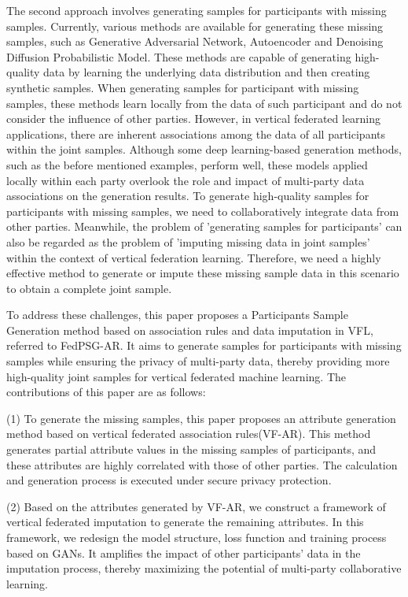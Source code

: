 \documentclass[final,1p,times]{elsarticle}
\begin{document}
The second approach involves generating samples for participants with missing samples. Currently, various methods are available for generating these missing samples, such as Generative Adversarial Network\cite{7}, Autoencoder\cite{8} and Denoising Diffusion Probabilistic Model\cite{9}. These methods are capable of generating high-quality data by learning the underlying data distribution and then creating synthetic samples. When generating samples for participant with missing samples, these methods learn locally from the data of such participant and do not consider the influence of other parties. However, in vertical federated learning applications, there are inherent associations among the data of all participants within the joint samples. Although some deep learning-based generation methods, such as the before mentioned examples, perform well, these models applied locally within each party overlook the role and impact of multi-party data associations on the generation results. To generate high-quality samples for participants with missing samples, we need to collaboratively integrate data from other parties. Meanwhile, the problem of 'generating samples for participants' can also be regarded as the problem of 'imputing missing data in joint samples' within the context of vertical federation learning. Therefore, we need a highly effective method to generate or impute these missing sample data in this scenario to obtain a complete joint sample.

To address these challenges, this paper proposes a Participants Sample Generation method based on association rules and data imputation in VFL, referred to FedPSG-AR. It aims to generate samples for participants with missing samples while ensuring the privacy of multi-party data, thereby providing more high-quality joint samples for vertical federated machine learning. The contributions of this paper are as follows:

(1) To generate the missing samples, this paper proposes an attribute generation method based on vertical federated association rules(VF-AR). This method generates partial attribute values in the missing samples of participants, and these attributes are highly correlated with those of other parties. The calculation and generation process is executed under secure privacy protection. 

(2) Based on the attributes generated by VF-AR, we construct a framework of vertical federated imputation to generate the remaining attributes. In this framework, we redesign the model structure, loss function and training process based on GANs. It amplifies the impact of other participants' data in the imputation process, thereby maximizing the potential of multi-party collaborative learning.
\end{document}
